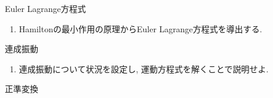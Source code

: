 \documentclass[11pt,a4paper]{jarticle}
\title{}
\author{解析力学基本事項}
\date{}
\begin{document}
\maketitle
\item Euler Lagrange方程式
\begin{enumerate}
    \item Hamiltonの最小作用の原理からEuler Lagrange方程式を導出する.
\end{enumerate}
\item 連成振動
\begin{enumerate}
    \item 連成振動について状況を設定し, 運動方程式を解くことで説明せよ.
\end{enumerate}
\item 正準変換
\end{document}
